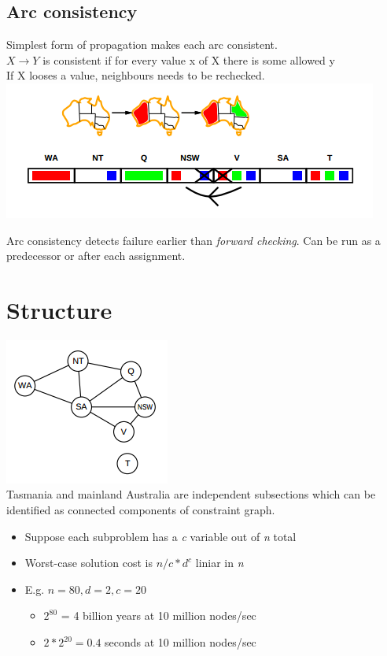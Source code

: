 \subsection{Arc consistency}
Simplest form of propagation makes each arc consistent.\\
$X \rightarrow  Y$ is consistent if for every value x of X there is some allowed y \\[3ex]
If X looses a value, neighbours needs to be rechecked.\\
\includegraphics[scale=1]{chap1_pics/arcconsistency1.png} 

Arc consistency detects failure earlier than \textit{forward checking}.
Can be run as a predecessor or after each assignment.

\section{Structure}
\includegraphics[scale=1]{chap1_pics/australiamap.png}\\
Tasmania and mainland Australia are independent subsections which can be identified as connected components of constraint graph. \\

\begin{itemize}
\item Suppose each subproblem has a \textit{c} variable out of \textit{n} total
\item Worst-case solution cost is $ n/c * d^c$ liniar in \textit{n}
\item E.g. $n = 80, d = 2, c =20$
\begin{itemize}
\item $2^{80}$ = 4 billion years at 10 million nodes/sec
\item $2 * 2^{20} = 0.4$ seconds at 10 million nodes/sec
\end{itemize}
\end{itemize} 

